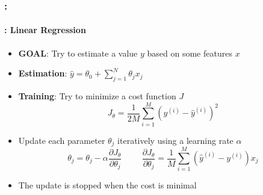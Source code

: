 \documentclass[xcolor=table]{beamer}
\begin{document}
\begin{frame}
	\frametitle{\insertshortsubtitle: \insertsection}
	\framesubtitle{\insertsubsection: Linear Regression}
	
	\begin{minipage}{0.62\textwidth} 
		\begin{itemize}
			\item \textbf{GOAL}: Try to estimate a value $ y $ based on some features $ x $
			\item \textbf{Estimation}: $ \hat{y} = \theta_0 + \sum_{j=1}^{N} \theta_j x_j $
			\item \textbf{Training}: Try to minimize a cost function $ J $
			\[J_\theta = \frac{1}{2M} \sum\limits_{i=1}^{M} (y^{(i)} - \hat{y}^{(i)})^2\]
		\end{itemize}
	\end{minipage}
	\begin{minipage}{0.37\textwidth} 
	\end{minipage}
	
	\begin{itemize}
		
		\item Update each parameter $ \theta_j $ iteratively using a learning rate $ \alpha $
		\[\theta_j = \theta_j - \alpha \frac{\partial J_\theta}{\partial \theta_j}
		\hspace{1cm}
		\frac{\partial J_\theta}{\partial \theta_j} = \frac{1}{M} \sum\limits_{i=1}^{M} (\hat{y}^{(i)} - y^{(i)}) x_j
		\]
		\item The update is stopped when the cost is minimal
	\end{itemize}

\end{frame}
\end{document}
